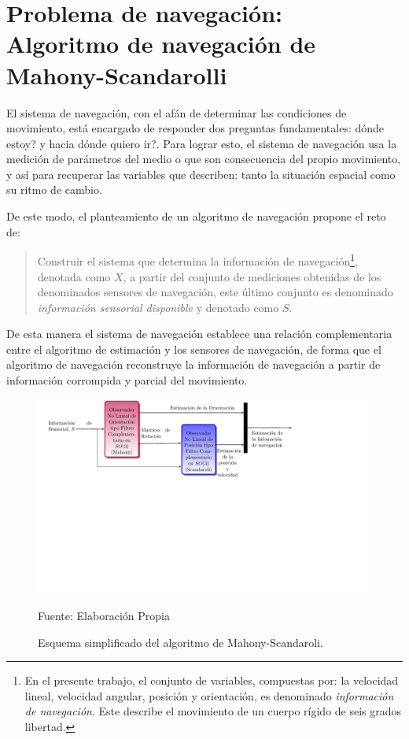 \documentclass[conference]{IEEEtran}
\begin{document}
\section{Problema de navegación: Algoritmo de navegación de Mahony-Scandarolli}
El sistema de navegación, con el afán de determinar las condiciones de movimiento, está encargado de responder dos preguntas fundamentales: dónde estoy? y hacia dónde quiero ir?. Para lograr esto, el sistema de navegación usa la medición de parámetros del medio o que son consecuencia del propio movimiento, y así para recuperar las variables que describen: tanto la situación espacial como su ritmo de cambio.\par
De este modo, el planteamiento de un algoritmo de navegación propone el reto de:
\begin{quote} Construir el sistema que determina la información de navegación\footnote{En el presente trabajo, el conjunto de variables, compuestas por: la velocidad lineal, velocidad angular, posición y orientación, es denominado \emph{información de navegación}. Este describe el movimiento de un cuerpo rígido de seis grados libertad.}, denotada como $X$, a partir del conjunto de mediciones obtenidas de los denominados sensores de navegación, este último conjunto es denominado \emph{información sensorial disponible} y denotado como $S$.
\end{quote}
De esta manera el sistema de navegación establece una relación complementaria entre el algoritmo de estimación y los sensores de navegación, de forma que el algoritmo de navegación reconstruye la información de navegación a partir de información corrompida y parcial del movimiento.\par
\begin{figure}
\begin{center}
\includegraphics[scale=0.61,viewport=10 220 560 380,clip]{aam2.pdf}
\caption{Esquema simplificado del algoritmo de Mahony-Scandaroli.}
\scriptsize{Fuente: Elaboración Propia}
\label{solucionMS_fig1}
\end{center}
\end{figure}
\end{document}
